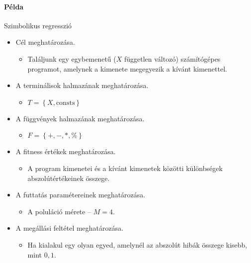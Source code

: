 \documentclass[../../main.tex]{subfiles}
\begin{document}
\paragraph{Példa} Szimbolikus regresszió
\begin{itemize}
  \item Cél meghatározása.
        \begin{itemize}
          \item Találjunk egy egybemenetű ($X$ független változó) számítógépes
                programot, amelynek a kimenete megegyezik a kívánt kimenettel.
        \end{itemize}
  \item A terminálisok halmazának meghatározása.
        \begin{itemize}
          \item $T = \left\{ X, \mathrm{consts} \right\}$
        \end{itemize}
  \item A függvények halmazának meghatározása.
        \begin{itemize}
          \item $F = \left\{ +, -, *, \% \right\}$
        \end{itemize}
  \item A fitness értékek meghatározása.
        \begin{itemize}
          \item A program kimenetei és a kívánt kimenetek közötti különbségek
                abszolútértékeinek összege.
        \end{itemize}
  \item A futtatás paramétereinek meghatározása.
        \begin{itemize}
          \item A poluláció mérete -- $M = 4$.
        \end{itemize}
  \item A megállási feltétel meghatározása.
        \begin{itemize}
          \item Ha kialakul egy olyan egyed, amelynél az abszolút hibák összege
                kisebb, mint $0,1$.
        \end{itemize}
\end{itemize}
\end{document}
